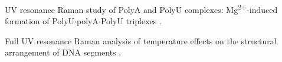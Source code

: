 
\noindent
\begin{docenum}
\item UV resonance Raman study of PolyA and PolyU complexes:
	Mg\textsuperscript{2+}-induced formation of PolyU$\cdot$polyA$\cdot$PolyU
	triplexes \parencite{Klener2015}.
\item Full UV resonance Raman analysis of temperature effects on the structural
	arrangement of DNA segments \parencite{Klener2021}.
\end{docenum}